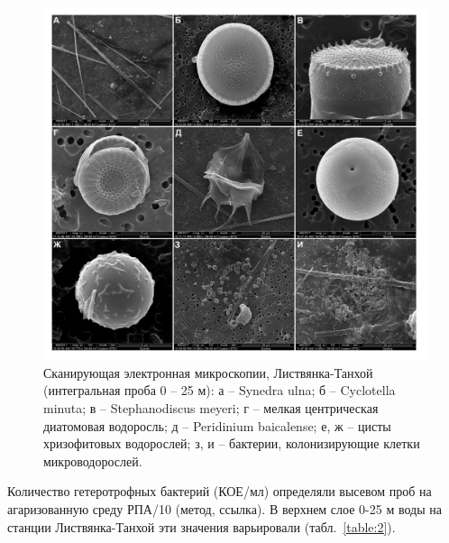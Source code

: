 \documentclass[a4paper,12pt,openany,final]{extreport}
\def\oldcaption{} \let\oldcaption=\caption
\def\caption{\stepcounter{captionsnum}\oldcaption}
\begin{document}
\begin{figure}\centering
\includegraphics[width=\linewidth]{media/image3.jpeg}

\caption{Сканирующая электронная микроскопии, Листвянка-Танхой
(интегральная проба 0 -- 25 м): а -- Synedra ulna; б -- Cyclotella
minuta; в -- Stephanodiscus meyeri; г -- мелкая центрическая диатомовая
водоросль; д -- Peridinium baicalense; е, ж -- цисты хризофитовых
водорослей; з, и -- бактерии, колонизирующие клетки микроводорослей.}\label{fig:micro}
\end{figure}

Количество гетеротрофных бактерий (КОЕ/мл) определяли высевом проб на
агаризованную среду РПА/10 (метод, ссылка). В верхнем слое 0-25 м воды
на станции Листвянка-Танхой эти значения варьировали (табл.~\ref{table:2}).
\end{document}
